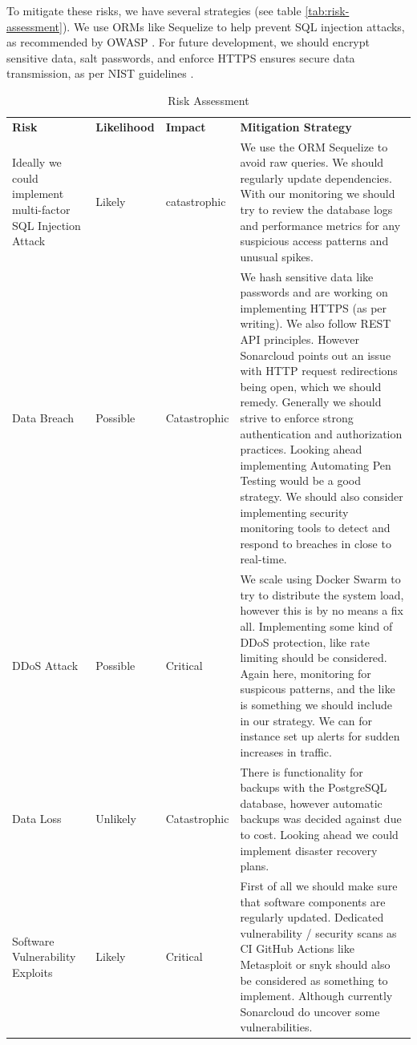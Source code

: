 \documentclass[11pt]{article}
\begin{document}
To mitigate these risks, we have several strategies (see table \ref{tab:risk-assessment}). We use ORMs like Sequelize to help prevent SQL injection attacks, as recommended by OWASP \citep{owasp_sql_prevention}. For future development, we should encrypt sensitive data, salt passwords, and enforce HTTPS ensures secure data transmission, as per NIST guidelines \citep{nist_tls}. 


\begin{table}[H]
    \centering
    \caption{Risk Assessment}
    \begin{tabular}{|p{3cm}|p{2cm}|p{2cm}|p{7cm}|}
        \hline
        \textbf{Risk} & \textbf{Likelihood} & \textbf{Impact} & \textbf{Mitigation Strategy} \\Ideally we could implement multi-factor
        \hline
        SQL Injection Attack & Likely & catastrophic & We use the ORM Sequelize to avoid raw queries. We should regularly update dependencies. With our monitoring we should try to review the database logs and performance metrics for any suspicious access patterns and unusual spikes. \\
        \hline
        Data Breach & Possible & Catastrophic & We hash sensitive data like passwords and are working on implementing HTTPS (as per writing). We also follow REST API principles. However Sonarcloud points out an issue with HTTP request redirections being open, which we should remedy. Generally we should strive to enforce strong authentication and authorization practices. Looking ahead implementing Automating Pen Testing
        would be a good strategy. We should also consider implementing security monitoring tools to detect and respond to breaches in close to real-time. \\
        \hline
        DDoS Attack & Possible & Critical &  We scale using Docker Swarm to try to distribute the system load, however this is by no  means a fix all. Implementing some kind of  DDoS protection, like rate limiting should be considered. Again here, monitoring for suspicous patterns, and the like is something we should include in our strategy. We can for instance set up alerts for sudden increases in traffic. \\
        \hline
        Data Loss & Unlikely & Catastrophic & There is functionality for backups with the PostgreSQL database, however automatic backups was decided against due to cost. Looking ahead we could  implement disaster recovery plans. \\
        \hline
        Software Vulnerability Exploits & Likely & Critical & First of all we should make sure that software components are regularly updated. Dedicated vulnerability / security scans as CI GitHub Actions like Metasploit or snyk  should also be considered as something to implement. Although currently Sonarcloud do uncover some vulnerabilities.  \\

\end{tabular}
\end{table}
\end{document}
